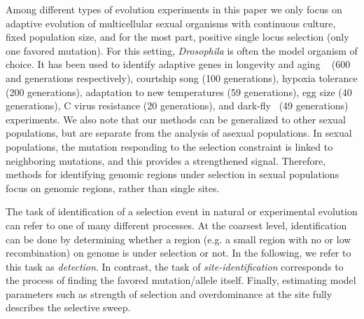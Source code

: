 \documentclass[11pt]{article}
\begin{document}
Among different types of evolution experiments
\cite{Barrick2013Genome,schlotterer2015combining} in this paper we
only focus on adaptive evolution of multicellular sexual organisms
with continuous culture, fixed population size, and for the most part,
positive single locus selection (only one favored mutation).  For this
setting, \emph{Drosophila} is often the model organism of choice. It
has been used to identify adaptive genes in longevity and aging
~\cite{burke2010genome,remolina2012genomic} (600 and generations
respectively), courtship song \cite{turner2011population} (100
generations), hypoxia tolerance \cite{zhou2011experimental} (200
generations), adaptation to new
temperatures\cite{orozco2012adaptation,tobler2014massive} (59
generations), egg size \cite{jha2015whole} (40 generations), C virus
resistance \cite{martins2014host} (20 generations), and
dark-fly~\cite{izutsu2015dynamics} (49 generations) experiments. We
also note that our methods can be generalized to other sexual
populations, but are separate from the analysis of asexual
populations. In sexual populations, the mutation responding to the
selection constraint is linked to neighboring mutations, and this
provides a strengthened signal. Therefore, methods for identifying
genomic regions under selection in sexual populations focus on genomic
regions, rather than single sites.

The task of identification of a selection event in natural or
experimental evolution can refer to one of many different
processes. At the coarsest level, identification can be done by
determining whether a region (e.g. a small region with no or low
recombination) on genome is under selection or not.  In the following,
we refer to this task as \emph{detection}. In contrast, the task of
\emph{site-identification} corresponds to the process of finding the
favored mutation/allele itself. Finally, estimating model parameters
such as strength of selection and overdominance at the site fully
describes the selective sweep.
\end{document}

